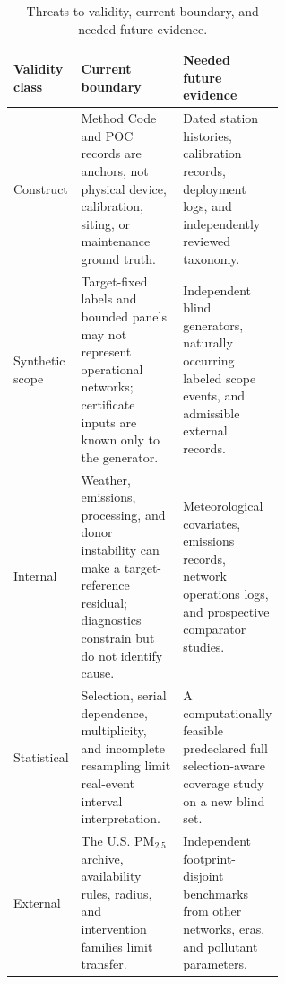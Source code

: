 \begin{table}[!htbp]
\centering
\caption{Threats to validity, current boundary, and needed future evidence.}
\label{tab:threats-validity}
\small
\begin{tabularx}{\linewidth}{@{}p{0.17\linewidth}p{0.43\linewidth}X@{}}
\toprule
Validity class & Current boundary & Needed future evidence \\
\midrule
Construct & Method Code and POC records are anchors, not physical device,
calibration, siting, or maintenance ground truth. & Dated station histories,
calibration records, deployment logs, and independently reviewed taxonomy. \\
\addlinespace
Synthetic scope & Target-fixed labels and bounded panels may not represent
operational networks; certificate inputs are known only to the generator. &
Independent blind generators, naturally occurring labeled scope events, and
admissible external records. \\
\addlinespace
Internal & Weather, emissions, processing, and donor instability can make a
target-reference residual; diagnostics constrain but do not identify cause. &
Meteorological covariates, emissions records, network operations logs, and
prospective comparator studies. \\
\addlinespace
Statistical & Selection, serial dependence, multiplicity, and incomplete
resampling limit real-event interval interpretation. & A computationally
feasible predeclared full selection-aware coverage study on a new blind set. \\
\addlinespace
External & The U.S. PM$_{2.5}$ archive, availability rules, radius, and
intervention families limit transfer. & Independent footprint-disjoint
benchmarks from other networks, eras, and pollutant parameters. \\
\bottomrule
\end{tabularx}
\end{table}
